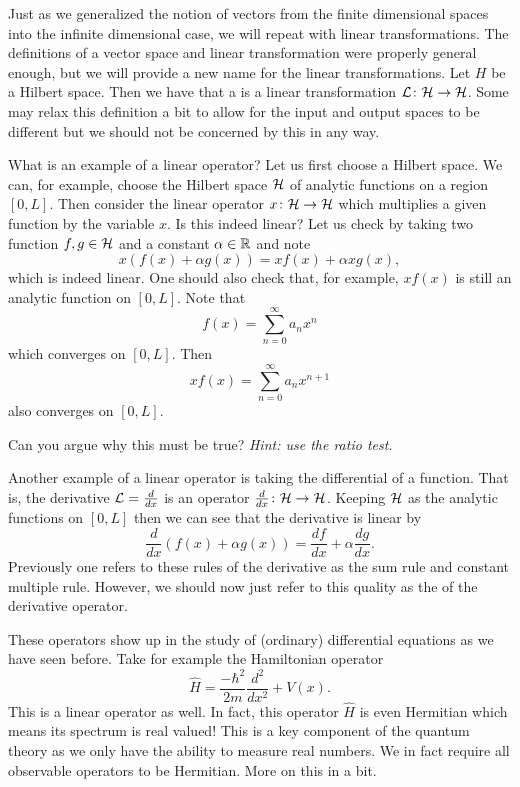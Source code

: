 Just as we generalized the notion of vectors from the finite dimensional spaces into the infinite dimensional case, we will repeat with linear transformations.  The definitions of a vector space and linear transformation were properly general enough, but we will provide a new name for the linear transformations. Let $H$ be a Hilbert space. Then we have that a  is a linear transformation $\mathcal{L} \colon \mathcal{H} \to \mathcal{H}$.  Some may relax this definition a bit to allow for the input and output spaces to be different but we should not be concerned by this in any way. 

What is an example of a linear operator? Let us first choose a Hilbert space. We can, for example, choose the Hilbert space $\mathcal{H}$ of analytic functions on a region $[0,L]$. Then consider the linear operator $x\colon \mathcal{H} \to \mathcal{H}$ which multiplies a given function by the variable $x$. Is this indeed linear?  Let us check by taking two function $f,g\in \mathcal{H}$ and a constant $\alpha \in \mathbb{R}$ and note
\[
x(f(x)+\alpha g(x)) = xf(x)+\alpha xg(x),
\]  
which is indeed linear.  One should also check that, for example, $xf(x)$ is still an analytic function on $[0,L]$. Note that
\[
f(x) = \sum_{n=0}^\infty a_n x^n
\]
which converges on $[0,L]$. Then 
\[
xf(x) = \sum_{n=0}^\infty a_n x^{n+1}
\]
also converges on $[0,L]$.

\begin{exercise}
	Can you argue why this must be true? \emph{Hint: use the ratio test.}
\end{exercise}

Another example of a linear operator is taking the differential of a function. That is, the derivative $\mathcal{L}=\frac{d}{dx}$ is an operator $\frac{d}{dx} \colon \mathcal{H} \to \mathcal{H}$.  Keeping $\mathcal{H}$ as the analytic functions on $[0,L]$ then we can see that the derivative is linear by
\[
	\frac{d}{dx} (f(x)+\alpha g(x)) = \frac{df}{dx} +\alpha \frac{dg}{dx}.
\]
Previously one refers to these rules of the derivative as the sum rule and constant multiple rule. However, we should now just refer to this quality as the  of the derivative operator.  

These operators show up in the study of (ordinary) differential equations as we have seen before. Take for example the Hamiltonian operator
\[
\hat{H} = \frac{-\hbar^2}{2m} \frac{d^2}{dx^2} + V(x).
\]
This is a linear operator as well.  In fact, this operator $\hat{H}$ is even Hermitian which means its spectrum is real valued! This is a key component of the quantum theory as we only have the ability to measure real numbers.  We in fact require all observable operators to be Hermitian.  More on this in a bit.

